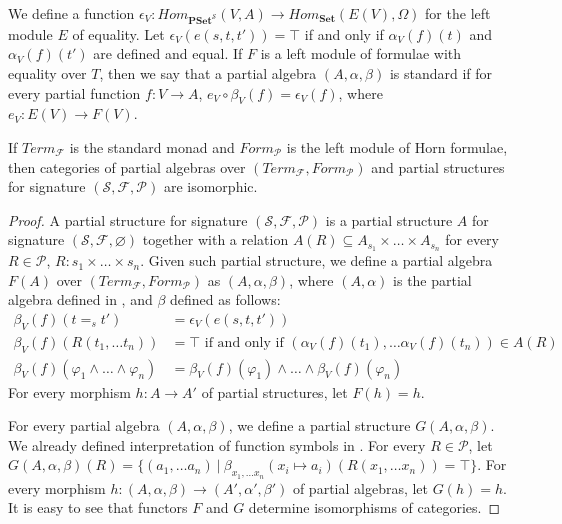 \documentclass[reqno]{amsart}
\theoremstyle{definition}
\theoremstyle{remark}
\newcommand{\cat}[1]{\mathbf{#1}}
\newcommand{\Set}{\cat{Set}}
\newcommand{\PSet}{\cat{PSet}}
\numberwithin{figure}{section}
\begin{document}
We define a function $\epsilon_V : Hom_{\PSet^\mathcal{S}}(V,A) \to Hom_\Set(E(V),\Omega)$ for the left module $E$ of equality.
Let $\epsilon_V(e(s,t,t')) = \top$ if and only if $\alpha_V(f)(t)$ and $\alpha_V(f)(t')$ are defined and equal.
If $F$ is a left module of formulae with equality over $T$, then we say that a partial algebra $(A,\alpha,\beta)$ is standard
    if for every partial function $f : V \to A$, $e_V \circ \beta_V(f) = \epsilon_V(f)$, where $e_V : E(V) \to F(V)$.

\begin{lem}
If $Term_\mathcal{F}$ is the standard monad and $Form_\mathcal{P}$ is the left module of Horn formulae,
    then categories of partial algebras over $(Term_\mathcal{F},Form_\mathcal{P})$ and partial structures for signature $(\mathcal{S},\mathcal{F},\mathcal{P})$ are isomorphic.
\end{lem}
\begin{proof}
A partial structure for signature $(\mathcal{S},\mathcal{F},\mathcal{P})$ is a partial structure $A$ for signature $(\mathcal{S},\mathcal{F},\varnothing)$
    together with a relation $A(R) \subseteq A_{s_1} \times \ldots \times A_{s_n}$ for every $R \in \mathcal{P}$, $R : s_1 \times \ldots \times s_n$.
Given such partial structure, we define a partial algebra $F(A)$ over $(Term_\mathcal{F},Form_\mathcal{P})$ as $(A,\alpha,\beta)$,
    where $(A,\alpha)$ is the partial algebra defined in , and $\beta$ defined as follows:
\begin{align*}
\beta_V(f)(t =_s t') & = \epsilon_V(e(s,t,t')) \\
\beta_V(f)(R(t_1, \ldots t_n)) & = \top \text{ if and only if } (\alpha_V(f)(t_1), \ldots \alpha_V(f)(t_n)) \in A(R) \\
\beta_V(f)(\varphi_1 \land \ldots \land \varphi_n) & = \beta_V(f)(\varphi_1) \land \ldots \land \beta_V(f)(\varphi_n)
\end{align*}
For every morphism $h : A \to A'$ of partial structures, let $F(h) = h$.

For every partial algebra $(A,\alpha,\beta)$, we define a partial structure $G(A,\alpha,\beta)$.
We already defined interpretation of function symbols in .
For every $R \in \mathcal{P}$, let $G(A,\alpha,\beta)(R) = \{ (a_1, \ldots a_n)\ |\ \beta_{x_1, \ldots x_n}(x_i \mapsto a_i)(R(x_1, \ldots x_n)) = \top \}$.
For every morphism $h : (A,\alpha,\beta) \to (A',\alpha',\beta')$ of partial algebras, let $G(h) = h$.
It is easy to see that functors $F$ and $G$ determine isomorphisms of categories.
\end{proof}
\end{document}
